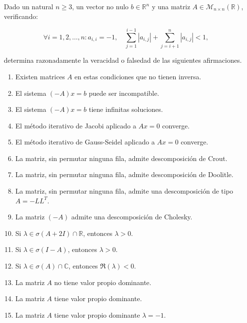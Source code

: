 \documentclass[12pt]{article}
\begin{document}
	\begin{ejercicio}[3 puntos]
		Dado un natural $n \geq 3$, un vector no nulo $b \in \mathbb{R}^n$ y una matriz $A \in \mathcal{M}_{n \times n}(\mathbb{R})$, verificando:
		
		$$ \forall i = 1, 2, \ldots, n : a_{i,i} = -1, \quad \sum_{j=1}^{i-1} |a_{i,j}| + \sum_{j=i+1}^{n} |a_{i,j}| < 1, $$
		
		determina razonadamente la veracidad o falsedad de las siguientes afirmaciones.
		\begin{enumerate}[label=\alph*)]
			\item Existen matrices $A$ en estas condiciones que no tienen inversa.
			
			\item El sistema $(-A)x = b$ puede ser incompatible.
			
			\item El sistema $(-A)x = b$ tiene infinitas soluciones.
			
			\item El método iterativo de Jacobi aplicado a $Ax = 0$ converge.
			
			\item El método iterativo de Gauss-Seidel aplicado a $Ax = 0$ converge.
			
			\item La matriz, sin permutar ninguna fila, admite descomposición de Crout.
			
			\item La matriz, sin permutar ninguna fila, admite descomposición de Doolitle.
			
			\item La matriz, sin permutar ninguna fila, admite una descomposición de tipo $A = -LL^T$.
			
			\item La matriz $(-A)$ admite una descomposición de Cholesky.
			
			\item Si $\lambda \in \sigma(A + 2I) \cap \mathbb{R}$, entonces $\lambda > 0$.
			
			\item Si $\lambda \in \sigma(I - A)$, entonces $\lambda > 0$.
			
			\item Si $\lambda \in \sigma(A) \cap \mathbb{C}$, entonces $\Re(\lambda) < 0$.
			
			\item La matriz $A$ no tiene valor propio dominante.
			
			\item La matriz $A$ tiene valor propio dominante.
			
			\item La matriz $A$ tiene valor propio dominante $\lambda = -1$.
		\end{enumerate}
	\end{ejercicio}
	
\end{document}
